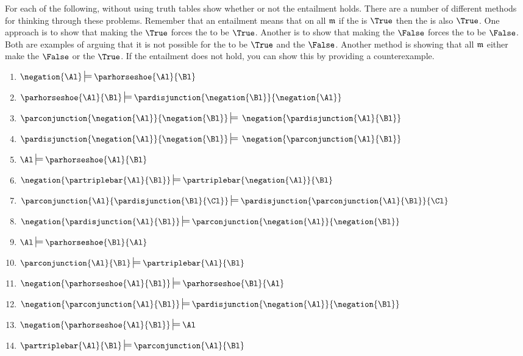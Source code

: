 For each of the following, without using truth tables show whether or not the entailment holds. 
There are a number of different methods for thinking through these problems.  
Remember that an entailment means that on all $\mathfrak{m}$ if the  is $\True$ then the  is also $\True$.  One approach is to show that making the  $\True$ forces the  to be $\True$.  Another is to show that making the  $\False$ forces the  to be $\False$.  Both are examples of arguing that it is not possible for the  to be $\True$ and the  $\False$.  Another method is showing that all $\mathfrak{m}$ either make the  $\False$ or the  $\True$.  If the entailment does not hold, you can show this by providing a counterexample.
\begin{multicols}{2}
\begin{enumerate}
\item {$\negation{\Al}\sdtstile{}{}\parhorseshoe{\Al}{\Bl}$}
\item {$\parhorseshoe{\Al}{\Bl}\sdtstile{}{}\pardisjunction{\negation{\Bl}}{\negation{\Al}}$}
\item {$\parconjunction{\negation{\Al}}{\negation{\Bl}}\sdtstile{}{}\:\negation{\pardisjunction{\Al}{\Bl}}$}
\item\label{HW Entailment 4} {$\pardisjunction{\negation{\Al}}{\negation{\Bl}}\sdtstile{}{}\:\negation{\parconjunction{\Al}{\Bl}}$}
\item {$\Al\sdtstile{}{}\parhorseshoe{\Al}{\Bl}$}
\item {$\negation{\partriplebar{\Al}{\Bl}}\sdtstile{}{}\partriplebar{\negation{\Al}}{\Bl}$} 
\vfill
\item {$\parconjunction{\Al}{\pardisjunction{\Bl}{\Cl}}\sdtstile{}{}\pardisjunction{\parconjunction{\Al}{\Bl}}{\Cl}$}
\item {$\negation{\pardisjunction{\Al}{\Bl}}\sdtstile{}{}\parconjunction{\negation{\Al}}{\negation{\Bl}}$}
\item {$\Al\sdtstile{}{}\parhorseshoe{\Bl}{\Al}$}
\item {$\parconjunction{\Al}{\Bl}\sdtstile{}{}\partriplebar{\Al}{\Bl}$}
\item {$\negation{\parhorseshoe{\Al}{\Bl}}\sdtstile{}{}\parhorseshoe{\Bl}{\Al}$}
\item\label{HW Entailment 12} {$\negation{\parconjunction{\Al}{\Bl}}\sdtstile{}{}\pardisjunction{\negation{\Al}}{\negation{\Bl}}$}
\item {$\negation{\parhorseshoe{\Al}{\Bl}}\sdtstile{}{}\Al$}
\item {$\partriplebar{\Al}{\Bl}\sdtstile{}{}\parconjunction{\Al}{\Bl}$}
\end{enumerate}
\end{multicols}

